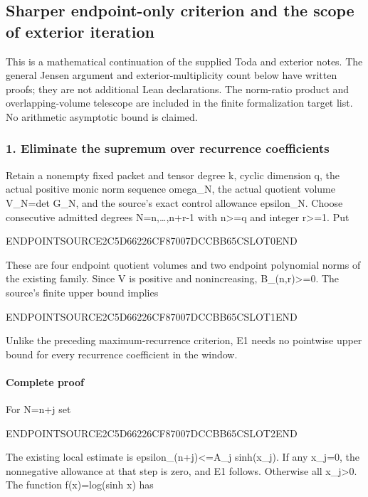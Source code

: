 \subsection{Sharper endpoint-only criterion and the scope of exterior iteration}\label{endpoint-pr23_original--sharper-endpoint-only-criterion-and-the-scope-of-exterior-iteration}

This is a mathematical continuation of the supplied Toda and exterior notes. The general Jensen argument and exterior-multiplicity count below have written proofs; they are not additional Lean declarations. The norm-ratio product and overlapping-volume telescope are included in the finite formalization target list. No arithmetic asymptotic bound is claimed.

\subsubsection{1. Eliminate the supremum over recurrence coefficients}\label{endpoint-pr23_original--eliminate-the-supremum-over-recurrence-coefficients}

Retain a nonempty fixed packet and tensor degree k, cyclic dimension q, the actual positive monic norm sequence omega\_N, the actual quotient volume V\_N=det G\_N, and the source's exact control allowance epsilon\_N. Choose consecutive admitted degrees N=n,\ldots,n+r-1 with n\textgreater=q and integer r\textgreater=1. Put

ENDPOINTSOURCE2C5D66226CF87007DCCBB65CSLOT0END

These are four endpoint quotient volumes and two endpoint polynomial norms of the existing family. Since V is positive and nonincreasing, B\_(n,r)\textgreater=0. The source's finite upper bound implies

ENDPOINTSOURCE2C5D66226CF87007DCCBB65CSLOT1END

Unlike the preceding maximum-recurrence criterion, E1 needs no pointwise upper bound for every recurrence coefficient in the window.

\paragraph{Complete proof}\label{endpoint-pr23_original--complete-proof}

For N=n+j set

ENDPOINTSOURCE2C5D66226CF87007DCCBB65CSLOT2END

The existing local estimate is epsilon\_(n+j)\textless=A\_j sinh(x\_j). If any x\_j=0, the nonnegative allowance at that step is zero, and E1 follows. Otherwise all x\_j\textgreater0. The function f(x)=log(sinh x) has

